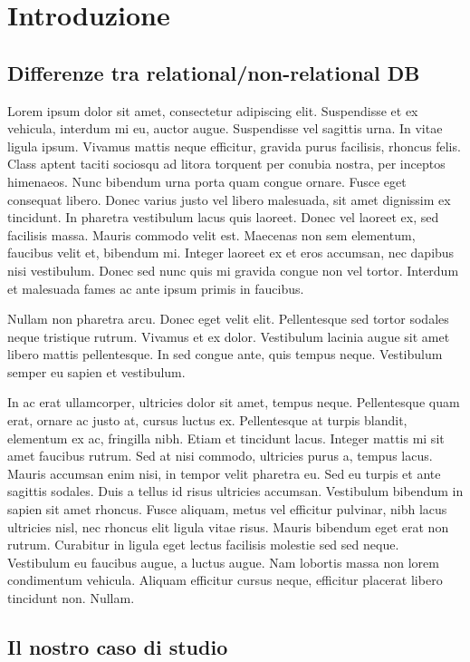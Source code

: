 \chapter{Introduzione}

\section{Differenze tra relational/non-relational DB}
Lorem ipsum dolor sit amet, consectetur adipiscing elit. Suspendisse et ex vehicula, interdum mi eu, auctor augue. Suspendisse vel sagittis urna. In vitae ligula ipsum. Vivamus mattis neque efficitur, gravida purus facilisis, rhoncus felis. Class aptent taciti sociosqu ad litora torquent per conubia nostra, per inceptos himenaeos. Nunc bibendum urna porta quam congue ornare. Fusce eget consequat libero. Donec varius justo vel libero malesuada, sit amet dignissim ex tincidunt. In pharetra vestibulum lacus quis laoreet. Donec vel laoreet ex, sed facilisis massa. Mauris commodo velit est. Maecenas non sem elementum, faucibus velit et, bibendum mi. Integer laoreet ex et eros accumsan, nec dapibus nisi vestibulum. Donec sed nunc quis mi gravida congue non vel tortor. Interdum et malesuada fames ac ante ipsum primis in faucibus.

Nullam non pharetra arcu. Donec eget velit elit. Pellentesque sed tortor sodales neque tristique rutrum. Vivamus et ex dolor. Vestibulum lacinia augue sit amet libero mattis pellentesque. In sed congue ante, quis tempus neque. Vestibulum semper eu sapien et vestibulum.

In ac erat ullamcorper, ultricies dolor sit amet, tempus neque. Pellentesque quam erat, ornare ac justo at, cursus luctus ex. Pellentesque at turpis blandit, elementum ex ac, fringilla nibh. Etiam et tincidunt lacus. Integer mattis mi sit amet faucibus rutrum. Sed at nisi commodo, ultricies purus a, tempus lacus. Mauris accumsan enim nisi, in tempor velit pharetra eu. Sed eu turpis et ante sagittis sodales. Duis a tellus id risus ultricies accumsan. Vestibulum bibendum in sapien sit amet rhoncus. Fusce aliquam, metus vel efficitur pulvinar, nibh lacus ultricies nisl, nec rhoncus elit ligula vitae risus. Mauris bibendum eget erat non rutrum. Curabitur in ligula eget lectus facilisis molestie sed sed neque. Vestibulum eu faucibus augue, a luctus augue. Nam lobortis massa non lorem condimentum vehicula. Aliquam efficitur cursus neque, efficitur placerat libero tincidunt non. Nullam.


\section{Il nostro caso di studio}

